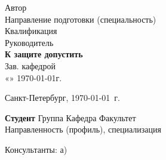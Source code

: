 \begin{titlepage}
	\hfill\begin{minipage}{\AllWidth}
	Автор
	\underline{\hspace{\pFIO}} 
	\underline{\hspace{\Sign}}
	\\
	Направление подготовки (специальность)
	\underline{\hspace{\pSpec}}
	\\
	Квалификация
	\underline{\hspace{\pQual}}
	\\
	Руководитель
	\underline{\hspace{\pRuler}}
	\underline{\hspace{\Sign}}
	\vspace{2cm}
	\\
	\textbf{К защите допустить}\\
	Зав. кафедрой
	\underline{\hspace{\pCRuler}}
	\underline{\hspace{\Sign}}
	\\
	\hspace*{\pAllowProtect}
	«\underline{\hspace{0.7cm}}» \underline{\hspace{2cm}} \CurrentYear\today г.
	\end{minipage}


	\vspace{2.5cm}

	\begin{center}
	Санкт-Петербург, 
	\CurrentYear\today \ г.
	\end{center}

	\newpage

	\textbf{Студент}
	\underline{\hspace{\pFIO}}
	Группа
	\underline{\hspace{2cm}}	
	Кафедра
	\underline{\hspace{2cm}}	
	Факультет
	\underline{\hspace{2cm}}	
	\\
	Направленность (профиль), специализация	
	\underline{\hspace{2cm}}	
	
	Консультанты:
	а) 
	\underline{\hspace{\pFIO}}
	\underline{\hspace{\Sign}}
	\\


\end{titlepage}
